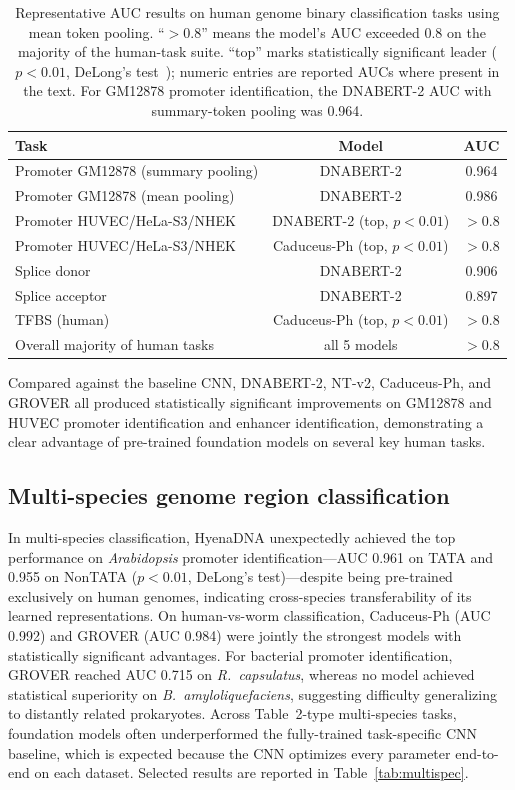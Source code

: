 \documentclass[11pt,a4paper]{article}
\begin{document}
\begin{table}[t]
\centering
\caption{Representative AUC results on human genome binary classification tasks using mean token pooling. ``$>$0.8'' means the model's AUC exceeded 0.8 on the majority of the human-task suite. ``top'' marks statistically significant leader ($p<0.01$, DeLong's test~\citep{delong1988comparing}); numeric entries are reported AUCs where present in the text. For GM12878 promoter identification, the DNABERT-2 AUC with summary-token pooling was 0.964.}
\label{tab:human}
\begin{tabular}{lcc}
\toprule
Task & Model & AUC \\
\midrule
Promoter GM12878 (summary pooling)        & DNABERT-2   & 0.964 \\
Promoter GM12878 (mean pooling)           & DNABERT-2   & 0.986 \\
Promoter HUVEC/HeLa-S3/NHEK               & DNABERT-2 (top, $p<0.01$) & $>$0.8 \\
Promoter HUVEC/HeLa-S3/NHEK               & Caduceus-Ph (top, $p<0.01$) & $>$0.8 \\
Splice donor                              & DNABERT-2   & 0.906 \\
Splice acceptor                           & DNABERT-2   & 0.897 \\
TFBS (human)                              & Caduceus-Ph (top, $p<0.01$) & $>$0.8 \\
Overall majority of human tasks           & all 5 models & $>$0.8 \\
\bottomrule
\end{tabular}
\end{table}

Compared against the baseline CNN, DNABERT-2, NT-v2, Caduceus-Ph, and GROVER all produced statistically significant improvements on GM12878 and HUVEC promoter identification and enhancer identification, demonstrating a clear advantage of pre-trained foundation models on several key human tasks.

\subsection{Multi-species genome region classification}
In multi-species classification, HyenaDNA unexpectedly achieved the top performance on \emph{Arabidopsis} promoter identification---AUC 0.961 on TATA and 0.955 on NonTATA ($p<0.01$, DeLong's test)---despite being pre-trained exclusively on human genomes, indicating cross-species transferability of its learned representations. On human-vs-worm classification, Caduceus-Ph (AUC 0.992) and GROVER (AUC 0.984) were jointly the strongest models with statistically significant advantages. For bacterial promoter identification, GROVER reached AUC 0.715 on \emph{R.~capsulatus}, whereas no model achieved statistical superiority on \emph{B.~amyloliquefaciens}, suggesting difficulty generalizing to distantly related prokaryotes. Across Table~2-type multi-species tasks, foundation models often underperformed the fully-trained task-specific CNN baseline, which is expected because the CNN optimizes every parameter end-to-end on each dataset. Selected results are reported in Table~\ref{tab:multispec}.
\end{document}
